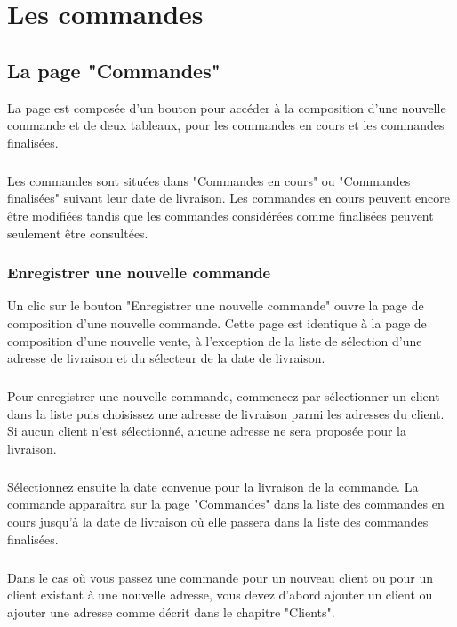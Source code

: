 \chapter{Les commandes}

\section{La page "Commandes"}
La page est composée d'un bouton pour accéder à la composition d'une nouvelle
commande et de deux tableaux, pour les commandes en cours et les commandes
finalisées.

\paragraph{}
Les commandes sont situées dans "Commandes en cours" ou "Commandes finalisées"
suivant leur date de livraison. Les commandes en cours peuvent encore être
modifiées tandis que les commandes considérées comme finalisées peuvent
seulement être consultées.

\subsection{Enregistrer une nouvelle commande}
Un clic sur le bouton "Enregistrer une nouvelle commande" ouvre la page de
composition d'une nouvelle commande. Cette page est identique à la page de
composition d'une nouvelle vente, à l'exception de la liste de sélection
d'une adresse de livraison et du sélecteur de la date de livraison.

\paragraph{}
Pour enregistrer une nouvelle commande, commencez par sélectionner un client
dans la liste puis choisissez une adresse de livraison parmi les adresses du
client. Si aucun client n'est sélectionné, aucune adresse ne sera
proposée pour la livraison.

\paragraph{}
Sélectionnez ensuite la date convenue pour la livraison de la commande.
La commande apparaîtra sur la page "Commandes" dans la liste des commandes en
cours jusqu'à la date de livraison où elle passera dans la liste des commandes
finalisées.

\paragraph{}
Dans le cas où vous passez une commande pour un nouveau client ou pour un client
existant à une nouvelle adresse, vous devez d'abord ajouter un client ou ajouter
une adresse comme décrit dans le chapitre "Clients".

